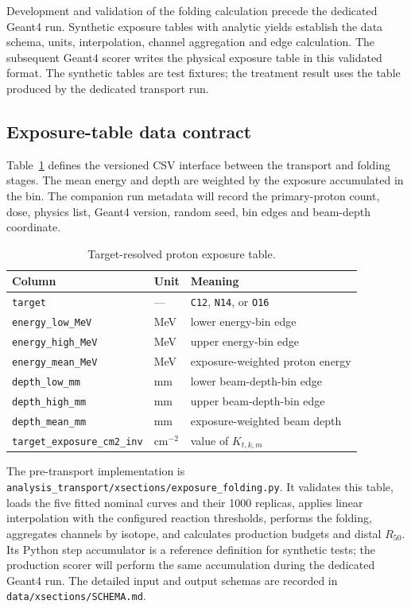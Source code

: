 \documentclass[11pt]{article}
\newcommand{\file}[1]{\texttt{#1}}
\begin{document}
Development and validation of the folding calculation precede the dedicated
Geant4 run.  Synthetic exposure tables with analytic yields establish the data
schema, units, interpolation, channel aggregation and edge calculation.  The
subsequent Geant4 scorer writes the physical exposure table in this validated
format.  The synthetic tables are test fixtures; the treatment result uses the
table produced by the dedicated transport run.

\subsection{Exposure-table data contract}

Table~\ref{tab:exposure-schema} defines the versioned CSV interface between the
transport and folding stages.  The mean energy and depth are weighted by the
exposure accumulated in the bin.  The companion run metadata will record the
primary-proton count, dose, physics list, Geant4 version, random seed, bin edges
and beam-depth coordinate.

\begin{table}[H]
\centering\small
\caption{Target-resolved proton exposure table.}
\label{tab:exposure-schema}
\begin{tabular}{lll}
\toprule
Column & Unit & Meaning \\
\midrule
\file{target} & --- & \file{C12}, \file{N14}, or \file{O16} \\
\file{energy\_low\_MeV} & MeV & lower energy-bin edge \\
\file{energy\_high\_MeV} & MeV & upper energy-bin edge \\
\file{energy\_mean\_MeV} & MeV & exposure-weighted proton energy \\
\file{depth\_low\_mm} & mm & lower beam-depth-bin edge \\
\file{depth\_high\_mm} & mm & upper beam-depth-bin edge \\
\file{depth\_mean\_mm} & mm & exposure-weighted beam depth \\
\file{target\_exposure\_cm2\_inv} & cm$^{-2}$ & value of $K_{t,k,m}$ \\
\bottomrule
\end{tabular}
\end{table}

The pre-transport implementation is
\file{analysis\_transport/xsections/exposure\_folding.py}.  It validates this
table, loads the five fitted nominal curves and their 1000 replicas, applies
linear interpolation with the configured reaction thresholds, performs the
folding, aggregates channels by isotope, and calculates production budgets and
distal $R_{50}$.  Its Python step accumulator is a reference definition for
synthetic tests; the production scorer will perform the same accumulation
during the dedicated Geant4 run.  The detailed input and output schemas are
recorded in \file{data/xsections/SCHEMA.md}.
\end{document}
